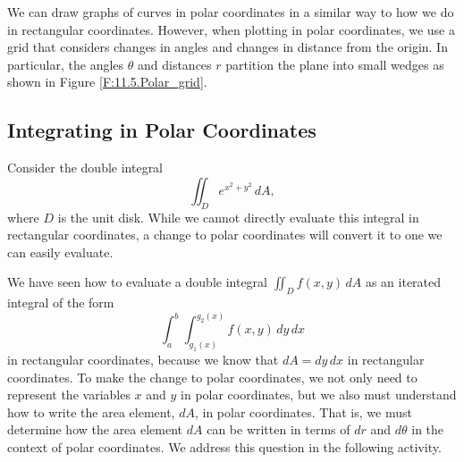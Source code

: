  \vspace*{5pt}
\nin {}
\vspace*{5pt}

%

We can draw graphs of curves in polar coordinates in a similar way to how we do in rectangular coordinates. However, when plotting in polar coordinates, we use a grid that considers changes in angles and changes in distance from the origin.  In particular,  the angles $\theta$ and distances $r$ partition the plane into small wedges as shown in Figure \ref{F:11.5.Polar_grid}.




\subsection*{Integrating in Polar Coordinates}

Consider the double integral
\[\iint_D e^{x^2+y^2} \, dA,\]
where $D$ is the unit disk.  While we cannot directly evaluate this integral in rectangular coordinates,  a change to polar coordinates will convert it to one we can easily evaluate.

We have seen how to evaluate a double integral $\displaystyle \iint_D f(x,y) \, dA$ as an iterated integral of the form
\[\int_a^b \int_{g_1(x)}^{g_2(x)} f(x,y) \, dy \, dx\]
in rectangular coordinates, because we know that $dA = dy \, dx$ in rectangular coordinates. To make the change to polar coordinates, we not only need to represent the variables $x$ and $y$ in polar coordinates, but we also must understand how to write the area element, $dA$, in polar coordinates. That is, we must determine how the area element $dA$ can be written in terms of $dr$ and $d\theta$ in the context of polar coordinates.  We address this question in the following activity.

